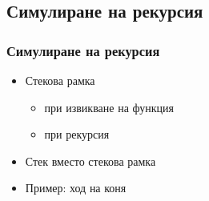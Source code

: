 \documentclass[alsotrans]{beamerswitch}
\begin{document}

\subsection{Симулиране на рекурсия}

\begin{frame}
  \frametitle{Симулиране на рекурсия}

  \begin{itemize}
  \item Стекова рамка
    \begin{itemize}
    \item при извикване на функция
    \item при рекурсия
    \end{itemize}
  \item Стек вместо стекова рамка
  \item Пример: ход на коня
  \end{itemize}
\end{frame}
\end{document}

